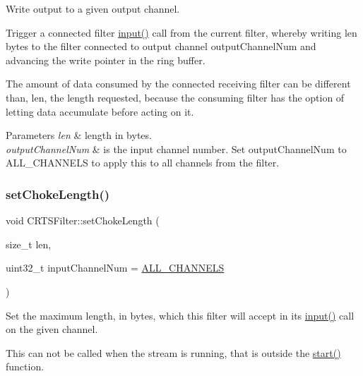 Write output to a given output channel.

Trigger a connected filter \hyperlink{classCRTSFilter_ab75eb3db5914c0d6b3781439d46b2301}{input()} call from the current filter, whereby writing {\ttfamily len} bytes to the filter connected to output channel {\ttfamily output\+Channel\+Num} and advancing the write pointer in the ring buffer.

The amount of data consumed by the connected receiving filter can be different than, {\ttfamily len}, the length requested, because the consuming filter has the option of letting data accumulate before acting on it.


\begin{DoxyParams}{Parameters}
{\em len} & length in bytes.\\
\hline
{\em output\+Channel\+Num} & is the input channel number. Set {\ttfamily output\+Channel\+Num} to {\ttfamily A\+L\+L\+\_\+\+C\+H\+A\+N\+N\+E\+LS} to apply this to all channels from the filter. \\
\hline
\end{DoxyParams}
\mbox{\label{classCRTSFilter_acadfaf372947b1b7cbcb5667e6b74026}} 
\subsubsection{\texorpdfstring{set\+Choke\+Length()}{setChokeLength()}}
{\footnotesize\ttfamily void C\+R\+T\+S\+Filter\+::set\+Choke\+Length (\begin{DoxyParamCaption}\item[{size\+\_\+t}]{len,  }\item[{uint32\+\_\+t}]{input\+Channel\+Num = {\ttfamily \hyperlink{classCRTSFilter_a9ea354654e8e2e8ce3bff293cc35fafe}{A\+L\+L\+\_\+\+C\+H\+A\+N\+N\+E\+LS}} }\end{DoxyParamCaption})\hspace{0.3cm}{\ttfamily [protected]}}

Set the maximum length, in bytes, which this filter will accept in its\textquotesingle{} \hyperlink{classCRTSFilter_ab75eb3db5914c0d6b3781439d46b2301}{input()} call on the given channel.

This can not be called when the stream is running, that is outside the \hyperlink{classCRTSFilter_a15a3e99b38a67fd40559776d468b95fa}{start()} function.


